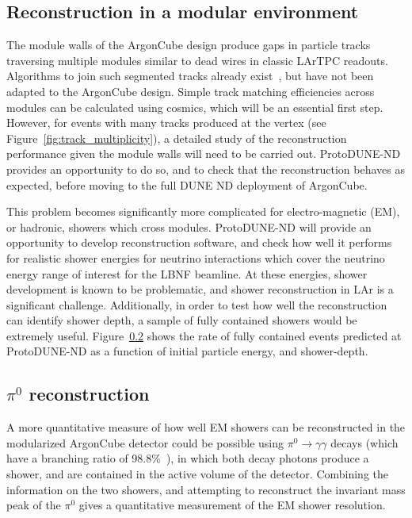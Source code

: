 \subsection{Reconstruction in a modular environment}
The module walls of the ArgonCube design produce gaps in particle tracks traversing multiple modules similar to dead wires in classic LArTPC readouts. Algorithms to join such segmented tracks already exist~\cite{pandora}, but have not been adapted to the ArgonCube design. Simple track matching efficiencies across modules can be calculated using cosmics, which will be an essential first step. However, for events with many tracks produced at the vertex (see Figure~\ref{fig:track_multiplicity}), a detailed study of the reconstruction performance given the module walls will need to be carried out. ProtoDUNE-ND provides an opportunity to do so, and to check that the reconstruction behaves as expected, before moving to the full DUNE ND deployment of ArgonCube.

This problem becomes significantly more complicated for electro-magnetic (EM), or hadronic, showers which cross modules. ProtoDUNE-ND will provide an opportunity to develop reconstruction software, and check how well it performs for realistic shower energies for neutrino interactions which cover the neutrino energy range of interest for the LBNF beamline. At these energies, shower development is known to be problematic, and shower reconstruction in LAr is a significant challenge. Additionally, in order to test how well the reconstruction can identify shower depth, a sample of fully contained showers would be extremely useful. Figure~\ref{}  shows the rate of fully contained events predicted at ProtoDUNE-ND as a function of initial particle energy, and shower-depth. 


\subsection{$\pi^{0}$ reconstruction}
A more quantitative measure of how well EM showers can be reconstructed in the modularized ArgonCube detector could be possible using $\pi^{0} \rightarrow \gamma\gamma$ decays (which have a branching ratio of 98.8\%~\addcite), in which both decay photons produce a shower, and are contained in the active volume of the detector. Combining the information on the two showers, and attempting to reconstruct the invariant mass peak of the $\pi^{0}$ gives a quantitative measurement of the EM shower resolution.

